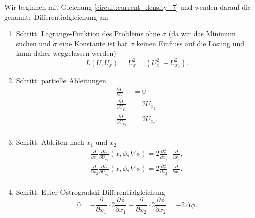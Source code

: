 Wir beginnen mit Gleichung \eqref{circuit:current_density_7} und wenden darauf die genannte Differentialgleichung an:
\begin{enumerate}
	\item Schritt: Lagrange-Funktion des Problems ohne $\sigma$ (da wir das Minimum suchen und $\sigma$ eine Konstante ist hat $\sigma$ keinen Einfluss auf die Lösung und kann daher weggelassen werden)
	\begin{equation}
		L(U, U_x)= U_x^2 = (U_{x_1}^2+U_{x_2}^2).
	\end{equation}
	\item Schritt: partielle Ableitungen
	\begin{equation}
		\begin{aligned}
			\frac{\partial L}{\partial U}&=0\\
			\frac{\partial L}{\partial U_{x_1}}&=2U_{x_1}\\
			\frac{\partial L}{\partial U_{x_2}}&=2U_{x_2}.\\
		\end{aligned}
	\end{equation}
	\item Schritt: Ableiten nach $x_1$ und $x_2$
	\begin{equation}
		\begin{aligned}
			\frac{\partial}{\partial x_1}\frac{\partial L}{\partial U_{x_1}}(x,\phi,\nabla \phi)=2\frac{\partial \phi}{\partial {x_1}}\cdot \frac{\partial}{\partial x_1},\\
			\frac{\partial}{\partial x_2}\frac{\partial L}{\partial U_{x_2}}(x,\phi,\nabla \phi)=2\frac{\partial \phi}{\partial {x_2}} \cdot \frac{\partial}{\partial x_1}.\\
		\end{aligned}
	\end{equation}
	\item Schritt: Euler-Ostrogradski Differentialgleichung
	\begin{equation}
		0=-\frac{\partial}{\partial x_1}\cdot 2\frac{\partial \phi}{\partial {x_1}}-\frac{\partial}{\partial x_2}\cdot 2\frac{\partial \phi}{\partial {x_2}}=-2\Delta\phi.
	\end{equation}
\end{enumerate}
